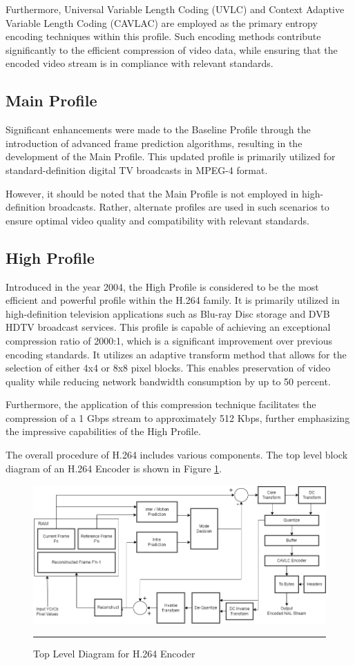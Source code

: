 Furthermore, Universal Variable Length Coding (UVLC) and Context Adaptive Variable Length Coding (CAVLAC) are employed as the primary entropy encoding techniques within this profile. Such encoding methods contribute significantly to the efficient compression of video data, while ensuring that the encoded video stream is in compliance with relevant standards. 

\subsection{Main Profile}
Significant enhancements were made to the Baseline Profile through the introduction of advanced frame prediction algorithms, resulting in the development of the Main Profile. This updated profile is primarily utilized for standard-definition digital TV broadcasts in MPEG-4 format.

However, it should be noted that the Main Profile is not employed in high-definition broadcasts. Rather, alternate profiles are used in such scenarios to ensure optimal video quality and compatibility with relevant standards.

\subsection{High Profile}
Introduced in the year 2004, the High Profile is considered to be the most efficient and powerful profile within the H.264 family. It is primarily utilized in high-definition television applications such as Blu-ray Disc storage and DVB HDTV broadcast services. This profile is capable of achieving an exceptional compression ratio of 2000:1, which is a significant improvement over previous encoding standards. It utilizes an adaptive transform method that allows for the selection of either 4x4 or 8x8 pixel blocks. This enables preservation of video quality while reducing network bandwidth consumption by up to 50 percent.

Furthermore, the application of this compression technique facilitates the compression of a 1 Gbps stream to approximately 512 Kbps, further emphasizing the impressive capabilities of the High Profile.

The overall procedure of H.264 includes various components. The top level block diagram of an H.264 Encoder is shown in Figure \ref{fig:toplevel}.

\begin{figure}[htbp]
	\centering
	\includegraphics[width = 5in]{./Figures/toplevel.png}
	\rule{35em}{0.5pt}
	\caption{Top Level Diagram for H.264 Encoder}
	\label{fig:toplevel}
\end{figure}

